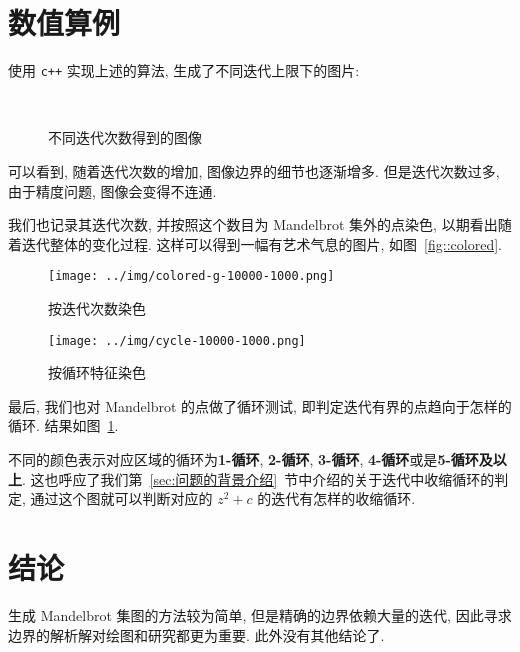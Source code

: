 \documentclass{ctexart}
\begin{document}
\section{数值算例} %
\label{sec:数值算例}
使用 \verb|c++| 实现上述的算法, 生成了不同迭代上限下的图片:\par
\begin{figure}[H]
\centering
{}
\quad
{}
\\
\quad
{}
\caption{不同迭代次数得到的图像}
\end{figure} 
可以看到, 随着迭代次数的增加, 图像边界的细节也逐渐增多. 但是迭代次数过多, 由于精度问题, 图像会变得不连通. \par
我们也记录其迭代次数, 并按照这个数目为 Mandelbrot 集外的点染色, 以期看出随着迭代整体的变化过程. 这样可以得到一幅有艺术气息的图片, 如图~\ref{fig::colored}.\par
\begin{figure}[H]
\centering
\begin{minipage}[t]{0.48\textwidth}
	\centering
	\texttt{[image: ../img/colored-g-10000-1000.png]}
	\caption{按迭代次数染色}
	\label{fig::colored}
\end{minipage} \quad
\begin{minipage}[t]{0.48\textwidth}
	\centering
	\texttt{[image: ../img/cycle-10000-1000.png]}
	\caption{按循环特征染色}
	\label{fig::iter}
\end{minipage} 
\end{figure}
最后, 我们也对 Mandelbrot 的点做了循环测试, 即判定迭代有界的点趋向于怎样的循环. 结果如图~\ref{fig::iter}. \par
{}
不同的颜色表示对应区域的循环为\textbf{\textcolor{color1}{1-循环}}, \textbf{\textcolor{color2}{2-循环}}, \textbf{\textcolor{color3}{3-循环}}, \textbf{\textcolor{color4}{4-循环}}或是\textbf{\textcolor{color5}{5-循环及以上}}. 这也呼应了我们第~\ref{sec:问题的背景介绍}~节中介绍的关于迭代中收缩循环的判定, 通过这个图就可以判断对应的 $z^2 + c$ 的迭代有怎样的收缩循环.
\section{结论} %
\label{sec:结论}
生成 Mandelbrot 集图的方法较为简单, 但是精确的边界依赖大量的迭代, 因此寻求边界的解析解对绘图和研究都更为重要. 此外没有其他结论了.

\end{document}
